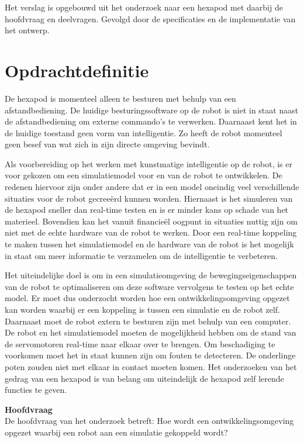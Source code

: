 \documentclass[10pt,a4paper]{article}
\begin{document}
Het verslag is opgebouwd uit het onderzoek naar een hexapod met daarbij de hoofdvraag en deelvragen. Gevolgd door de specificaties en de implementatie van het ontwerp.

\newpage

\section{Opdrachtdefinitie} 
De hexapod is momenteel alleen te besturen met behulp van een afstandbediening. De huidige besturingssoftware op de robot is niet in staat naast de afstandbediening om externe commando's te verwerken. Daarnaast kent het in de huidige toestand geen vorm van intelligentie. Zo heeft de robot momenteel geen besef van wat zich in zijn directe omgeving bevindt.

Als voorbereiding op het werken met kunstmatige intelligentie op de robot, is er voor gekozen om een simulatiemodel voor en van de robot te ontwikkelen. De redenen hiervoor zijn onder andere dat er in een model oneindig veel verschillende situaties voor de robot gecree\"erd kunnen worden. Hiernaast is het simuleren van de hexapod sneller dan real-time testen en is er minder kans op schade van het materieel. Bovendien kan het vanuit financie\"el oogpunt in situaties nuttig zijn om niet met de echte hardware van de robot te werken. 
Door een real-time koppeling te maken tussen het simulatiemodel en de hardware van de robot is het mogelijk in staat om meer informatie te verzamelen om de intelligentie te verbeteren.

Het uiteindelijke doel is om in een simulatieomgeving de bewegingseigenschappen van de robot te optimaliseren om deze software vervolgens te testen op het echte model. Er moet dus onderzocht worden hoe een ontwikkelingsomgeving opgezet kan worden waarbij er een koppeling is tussen een simulatie en de robot zelf. Daarnaast moet de robot extern te besturen zijn met behulp van een computer. De robot en het simulatiemodel moeten de mogelijkheid hebben om de stand van de servomotoren real-time naar elkaar over te brengen. Om beschadiging te voorkomen moet het in staat kunnen zijn om fouten te detecteren. De onderlinge poten zouden niet met elkaar in contact moeten komen. Het onderzoeken van het gedrag van een hexapod is van belang om uiteindelijk de hexapod zelf lerende functies te geven.
\newpage

\iffalse %
\textbf{Hoofdvraag\\}
De hoofdvraag van het onderzoek betreft:
Hoe wordt een ontwikkelingsomgeving opgezet waarbij een robot aan een simulatie gekoppeld wordt?
\end{document}
